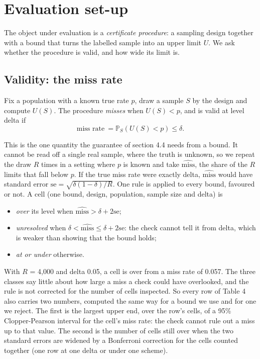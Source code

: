 \documentclass[11pt]{article}
\begin{document}
\section{Evaluation set-up}

The object under evaluation is a \emph{certificate procedure}: a sampling design together with a bound that turns the labelled sample into an upper limit $U$. We ask whether the procedure is valid, and how wide its limit is.


\subsection{Validity: the miss rate}

Fix a population with a known true rate $p$, draw a sample $S$ by the design and compute $U (S )$. The procedure \emph{misses} when $U (S ) < p$, and is valid at level delta if
\[
\text{miss rate}\ = \mathbb{P}_{S} ( U (S ) < p ) \le \delta .
\]

This is the one quantity the guarantee of section 4.4 needs from a bound. It cannot be read off a single real sample, where the truth is unknown, so we repeat the draw $R$ times in a setting where $p$ is known and take $\hat{\mathrm{miss}}$, the share of the $R$ limits that fall below $p$. If the true miss rate were exactly delta, $\hat{\mathrm{miss}}$ would have standard error $\mathrm{se} = \sqrt{\delta (1 - \delta ) / R}$. One rule is applied to every bound, favoured or not. A cell (one bound, design, population, sample size and delta) is


\begin{itemize}
\item \emph{over} its level when $\hat{\mathrm{miss}} > \delta + 2 \mathrm{se}$;
\item \emph{unresolved} when $\delta < \hat{\mathrm{miss}} \le \delta + 2 \mathrm{se}$: the check cannot tell it from delta, which is weaker than showing that the bound holds;
\item \emph{at or under} otherwise.
\end{itemize}

With $R$ = 4,000 and delta 0.05, a cell is over from a miss rate of 0.057. The three classes say little about how large a miss a check could have overlooked, and the rule is not corrected for the number of cells inspected. So every row of Table 4 also carries two numbers, computed the same way for a bound we use and for one we reject. The first is the largest upper end, over the row's cells, of a 95\% Clopper-Pearson interval for the cell's miss rate: the check cannot rule out a miss up to that value. The second is the number of cells still over when the two standard errors are widened by a Bonferroni correction for the cells counted together (one row at one delta or under one scheme).
\end{document}
